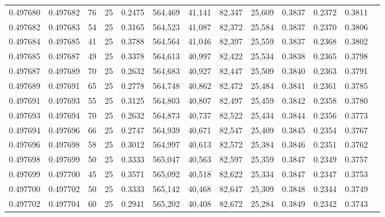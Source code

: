 \begin{tabular}{rrrrrrrrrrrrr}
0.497680 & 0.497682 &    76 &  25 &                                     0.2475 & 564,469 &  41,141 &  82,347 &  25,609 & 0.3837 & 0.2372 & 0.3811 \\
0.497682 & 0.497683 &    54 &  25 &                                     0.3165 & 564,523 &  41,087 &  82,372 &  25,584 & 0.3837 & 0.2370 & 0.3806 \\
0.497684 & 0.497685 &    41 &  25 &                                     0.3788 & 564,564 &  41,046 &  82,397 &  25,559 & 0.3837 & 0.2368 & 0.3802 \\
0.497685 & 0.497687 &    49 &  25 &                                     0.3378 & 564,613 &  40,997 &  82,422 &  25,534 & 0.3838 & 0.2365 & 0.3798 \\
0.497687 & 0.497689 &    70 &  25 &                                     0.2632 & 564,683 &  40,927 &  82,447 &  25,509 & 0.3840 & 0.2363 & 0.3791 \\
0.497689 & 0.497691 &    65 &  25 &                                     0.2778 & 564,748 &  40,862 &  82,472 &  25,484 & 0.3841 & 0.2361 & 0.3785 \\
0.497691 & 0.497693 &    55 &  25 &                                     0.3125 & 564,803 &  40,807 &  82,497 &  25,459 & 0.3842 & 0.2358 & 0.3780 \\
0.497693 & 0.497694 &    70 &  25 &                                     0.2632 & 564,873 &  40,737 &  82,522 &  25,434 & 0.3844 & 0.2356 & 0.3773 \\
0.497694 & 0.497696 &    66 &  25 &                                     0.2747 & 564,939 &  40,671 &  82,547 &  25,409 & 0.3845 & 0.2354 & 0.3767 \\
0.497696 & 0.497698 &    58 &  25 &                                     0.3012 & 564,997 &  40,613 &  82,572 &  25,384 & 0.3846 & 0.2351 & 0.3762 \\
0.497698 & 0.497699 &    50 &  25 &                                     0.3333 & 565,047 &  40,563 &  82,597 &  25,359 & 0.3847 & 0.2349 & 0.3757 \\
0.497699 & 0.497700 &    45 &  25 &                                     0.3571 & 565,092 &  40,518 &  82,622 &  25,334 & 0.3847 & 0.2347 & 0.3753 \\
0.497700 & 0.497702 &    50 &  25 &                                     0.3333 & 565,142 &  40,468 &  82,647 &  25,309 & 0.3848 & 0.2344 & 0.3749 \\
0.497702 & 0.497704 &    60 &  25 &                                     0.2941 & 565,202 &  40,408 &  82,672 &  25,284 & 0.3849 & 0.2342 & 0.3743 \\

\end{tabular}
